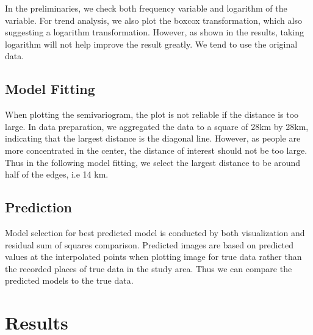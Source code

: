 \documentclass[hidelinks,12pt]{article}
\begin{document}
 	In the preliminaries, we check both frequency variable and logarithm of the variable. For trend analysis, we also plot the boxcox transformation, which also suggesting a logarithm transformation. However, as shown in the results, taking logarithm will not help improve the result greatly. We tend to use the original data.
	\subsection{Model Fitting}
	When plotting the semivariogram, the plot is not reliable if the distance is too large. In data preparation, we aggregated the data to a square of 28km by 28km, indicating that the largest distance is the diagonal line. However, as people are more concentrated in the center, the distance of interest should not be too large. Thus in the following model fitting, we select the largest distance to be around half of the edges, i.e 14 km.
	\subsection{Prediction}
	Model selection for best predicted model is conducted by both visualization and residual sum of squares comparison. Predicted images are based on predicted values at the interpolated points when plotting image for true data rather than the recorded places of true data in the study area. Thus we can compare the predicted models to the true data. 
	
	\section{Results}\label{sec:res}
\end{document}
